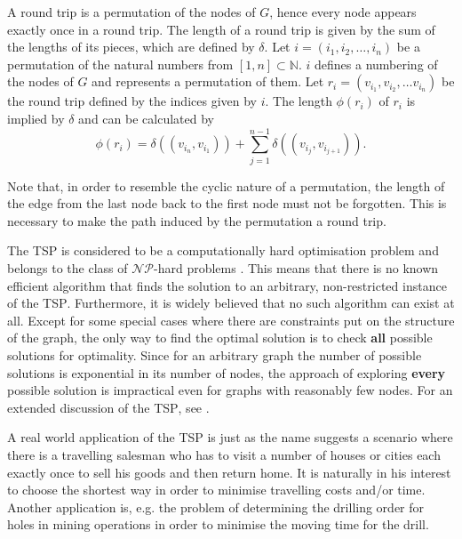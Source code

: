 A round trip is a permutation of the nodes of $G$, hence every node appears exactly once in a round trip. The length of a round trip is given by the sum of the lengths of its pieces, which are defined by $\delta$. Let $i = \left( i_1, i_2, \ldots, i_n \right)$ be a permutation of the natural numbers from $[1, n] \subset \mathbb{N}$. $i$ defines a numbering of the nodes of $G$ and represents a permutation of them. Let $r_i = \left( v_{i_1}, v_{i_2}, \ldots v_{i_n} \right)$ be the round trip defined by the indices given by $i$. The length $\phi \left( r_i \right)$ of $r_i$ is implied by $\delta$ and can be calculated by
\vspace*{-0.5em}
\begin{equation*}
  \label{eqn:length_roundtrip}
  \phi \left( r_i \right) = \delta \left( \left( v_{i_n}, v_{i_1} \right) \right) + \sum_{j=1}^{n-1} \delta \left( \left( v_{i_j}, v_{i_{j+1}} \right) \right).
\end{equation*}

\vspace*{-0.5em}
Note that, in order to resemble the cyclic nature of a permutation, the length of the edge from the last node back to the first node must not be forgotten. This is necessary to make the path induced by the permutation a round trip.


The \textsc{TSP} is considered to be a computationally hard optimisation problem and belongs to the class of $\mathcal{NP}$-hard problems \cite{Garey:1979:CIG:578533}. This means that there is no known efficient algorithm that finds the solution to an arbitrary, non-restricted instance of the \textsc{TSP}. Furthermore, it is widely believed that no such algorithm can exist at all. Except for some special cases where there are constraints put on the structure of the graph, the only way to find the optimal solution is to check \textbf{all} possible solutions for optimality. Since for an arbitrary graph the number of possible solutions is exponential in its number of nodes, the approach of exploring \textbf{every} possible solution is impractical even for graphs with reasonably few nodes. For an extended discussion of the \textsc{TSP}, see \cite{shmoys1985traveling}.

A real world application of the \textsc{TSP} is just as the name suggests a scenario where there is a travelling salesman who has to visit a number of houses or cities each exactly once to sell his goods and then return home. It is naturally in his interest to choose the shortest way in order to minimise travelling costs and/or time. Another application is, e.g. the problem of determining the drilling order for holes in mining operations in order to minimise the moving time for the drill.

